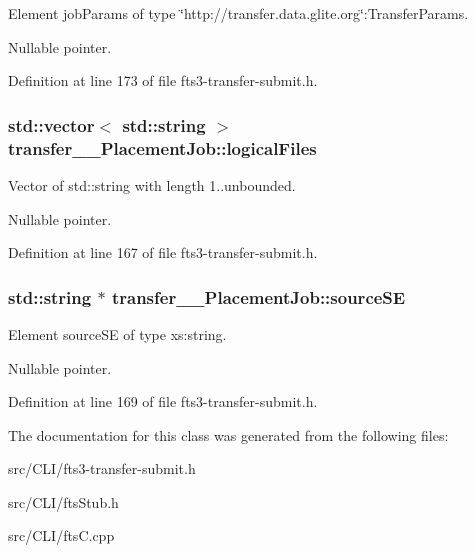 Element jobParams of type \char`\"{}http://transfer.data.glite.org\char`\"{}:TransferParams. 

Nullable pointer. 

Definition at line 173 of file fts3-\/transfer-\/submit.h.

\subsubsection[{logicalFiles}]{\setlength{\rightskip}{0pt plus 5cm}std::vector$<$ std::string $>$ {\bf transfer\_\-\_\-PlacementJob::logicalFiles}}\label{classtransfer____PlacementJob_a180ff8c7361bddcbed146216faa8fbeb}


Vector of std::string with length 1..unbounded. 

Nullable pointer. 

Definition at line 167 of file fts3-\/transfer-\/submit.h.

\subsubsection[{sourceSE}]{\setlength{\rightskip}{0pt plus 5cm}std::string $\ast$ {\bf transfer\_\-\_\-PlacementJob::sourceSE}}\label{classtransfer____PlacementJob_adc36949266a8e6b451fc7d9c244f7a61}


Element sourceSE of type xs:string. 

Nullable pointer. 

Definition at line 169 of file fts3-\/transfer-\/submit.h.



The documentation for this class was generated from the following files:\begin{DoxyCompactItemize}
\item 
src/CLI/fts3-\/transfer-\/submit.h\item 
src/CLI/ftsStub.h\item 
src/CLI/ftsC.cpp\end{DoxyCompactItemize}
